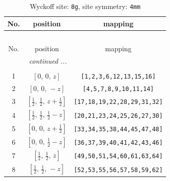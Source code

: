 \documentclass[fleqn,8pt]{jsarticle}
\begin{document}
\begin{longtable}{ccc}
\caption{Wyckoff site: {\tt 8g}, site symmetry: {\tt 4mm}}
 \\
 \hline \hline
No. & position & mapping \\ \hline \endfirsthead

\multicolumn{2}{l}{\tablename\ \thetable{}} \\
 \hline \hline
No. & position & mapping \\ \hline \endhead

 \hline \hline
\multicolumn{2}{r}{\footnotesize\it continued ...} \\ \endfoot

 \hline \hline
\multicolumn{2}{r}{} \\ \endlastfoot

1 & $\left[ 0,\, 0,\, z \right]$ & {\tt [1,2,3,6,12,13,15,16]} \\ \hline
2 & $\left[ 0,\, 0,\, - z \right]$ & {\tt [4,5,7,8,9,10,11,14]} \\ \hline
3 & $\left[ \frac{1}{2},\, \frac{1}{2},\, z + \frac{1}{2} \right]$ & {\tt [17,18,19,22,28,29,31,32]} \\ \hline
4 & $\left[ \frac{1}{2},\, \frac{1}{2},\, \frac{1}{2} - z \right]$ & {\tt [20,21,23,24,25,26,27,30]} \\ \hline
5 & $\left[ 0,\, 0,\, z + \frac{1}{2} \right]$ & {\tt [33,34,35,38,44,45,47,48]} \\ \hline
6 & $\left[ 0,\, 0,\, \frac{1}{2} - z \right]$ & {\tt [36,37,39,40,41,42,43,46]} \\ \hline
7 & $\left[ \frac{1}{2},\, \frac{1}{2},\, z \right]$ & {\tt [49,50,51,54,60,61,63,64]} \\ \hline
8 & $\left[ \frac{1}{2},\, \frac{1}{2},\, - z \right]$ & {\tt [52,53,55,56,57,58,59,62]} \\
\end{longtable}
\renewcommand{\arraystretch}{1.2}
\end{document}
